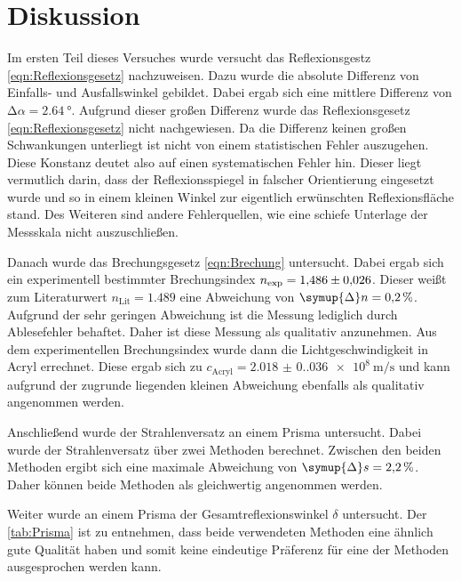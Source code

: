 \section{Diskussion}
\label{sec:Diskussion}
Im ersten Teil dieses Versuches wurde versucht das Reflexionsgestz \eqref{eqn:Reflexionsgesetz} nachzuweisen. Dazu wurde die absolute Differenz von Einfalls- und 
Ausfallswinkel gebildet. Dabei ergab sich eine mittlere Differenz von $\mathrm{\Delta}\alpha = \qty{2.64}{\degree}$. Aufgrund dieser großen Differenz wurde das 
Reflexionsgesetz \eqref{eqn:Reflexionsgesetz} nicht nachgewiesen. Da die Differenz keinen großen Schwankungen unterliegt ist nicht von einem statistischen Fehler auszugehen.
Diese Konstanz deutet also auf einen systematischen Fehler hin. Dieser liegt vermutlich darin, dass der Reflexionsspiegel in falscher Orientierung eingesetzt wurde und so 
in einem kleinen Winkel zur eigentlich erwünschten Reflexionsfläche stand. Des Weiteren sind andere Fehlerquellen, wie eine schiefe Unterlage der Messskala nicht
auszuschließen. 

Danach wurde das Brechungsgesetz \eqref{eqn:Brechung} untersucht. Dabei ergab sich ein experimentell bestimmter Brechungsindex $n_{\text{exp}} = \num{1.486 +- 0.026}$. Dieser
weißt zum Literaturwert $n_{\text{Lit}} = \num{1.489}$ eine Abweichung von $\symup{\Delta}n = \qty{0.2}{\percent}$. Aufgrund der sehr geringen Abweichung ist die Messung 
lediglich durch Ablesefehler behaftet. Daher ist diese Messung als qualitativ anzunehmen. Aus dem experimentellen Brechungsindex wurde dann die Lichtgeschwindigkeit in 
Acryl errechnet. Diese ergab sich zu $c_{\text{Acryl}} = \qty{2.018(0.036)e8}{\metre\per\second}$ und kann aufgrund der zugrunde liegenden kleinen Abweichung ebenfalls als 
qualitativ angenommen werden. 

Anschließend wurde der Strahlenversatz an einem Prisma untersucht. Dabei wurde der Strahlenversatz über zwei Methoden berechnet. Zwischen den beiden Methoden ergibt sich eine 
maximale Abweichung von $\symup{\Delta}s = \qty{2.2}{\percent}$. Daher können beide Methoden als gleichwertig angenommen werden.

Weiter wurde an einem Prisma der Gesamtreflexionswinkel $\delta$ untersucht. Der \autoref{tab:Prisma} ist zu entnehmen, dass beide verwendeten Methoden eine ähnlich gute 
Qualität haben und somit keine eindeutige Präferenz für eine der Methoden ausgesprochen werden kann. 

